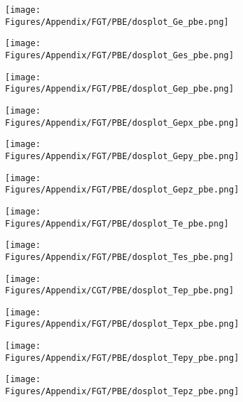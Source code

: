\begin{figure}[H]
\hfill
\begin{subfigure}{0.24\textwidth}
    \texttt{[image: Figures/Appendix/FGT/PBE/dosplot\_Ge\_pbe.png]}
    \label{dosplot_FeGe_pbe}
\end{subfigure}
\hfill
\begin{subfigure}{0.24\textwidth}
    \texttt{[image: Figures/Appendix/FGT/PBE/dosplot\_Ges\_pbe.png]}
    \label{dosplot_FeGes_pbe}
\end{subfigure}
\hfill
\begin{subfigure}{0.24\textwidth}
    \texttt{[image: Figures/Appendix/FGT/PBE/dosplot\_Gep\_pbe.png]}
    \label{dosplot_FeGep_pbe}
\end{subfigure}
\hfill
\begin{subfigure}{0.24\textwidth}
    \texttt{[image: Figures/Appendix/FGT/PBE/dosplot\_Gepx\_pbe.png]}
    \label{dosplot_FeGepx_pbe}
\end{subfigure}
\hfill
\begin{subfigure}{0.24\textwidth}
    \texttt{[image: Figures/Appendix/FGT/PBE/dosplot\_Gepy\_pbe.png]}
    \label{dosplot_FeGepy_pbe}
\end{subfigure}
\hfill
\begin{subfigure}{0.24\textwidth}
    \texttt{[image: Figures/Appendix/FGT/PBE/dosplot\_Gepz\_pbe.png]}
    \label{dosplot_FeGepz_pbe}
\end{subfigure}
\hfill
\begin{subfigure}{0.24\textwidth}
    \texttt{[image: Figures/Appendix/FGT/PBE/dosplot\_Te\_pbe.png]}
    \label{dosplot_FeTe_pbe}
\end{subfigure}
\hfill
\begin{subfigure}{0.24\textwidth}
    \texttt{[image: Figures/Appendix/FGT/PBE/dosplot\_Tes\_pbe.png]}
    \label{dosplot_FeTes_pbe}
\end{subfigure}
\hfill
\begin{subfigure}{0.24\textwidth}
    \texttt{[image: Figures/Appendix/CGT/PBE/dosplot\_Tep\_pbe.png]}
    \label{dosplot_FeTep_pbe}
\end{subfigure}
\hfill
\begin{subfigure}{0.24\textwidth}
    \texttt{[image: Figures/Appendix/FGT/PBE/dosplot\_Tepx\_pbe.png]}
    \label{dosplot_FeTepx_pbe}
\end{subfigure}
\hfill
\begin{subfigure}{0.24\textwidth}
    \texttt{[image: Figures/Appendix/FGT/PBE/dosplot\_Tepy\_pbe.png]}
    \label{dosplot_FeTepy_pbe}
\end{subfigure}
\begin{subfigure}{0.24\textwidth}
    \texttt{[image: Figures/Appendix/FGT/PBE/dosplot\_Tepz\_pbe.png]}
    \label{dosplot_FeTepz_pbe}
\end{subfigure}
\hfill


\end{figure}
